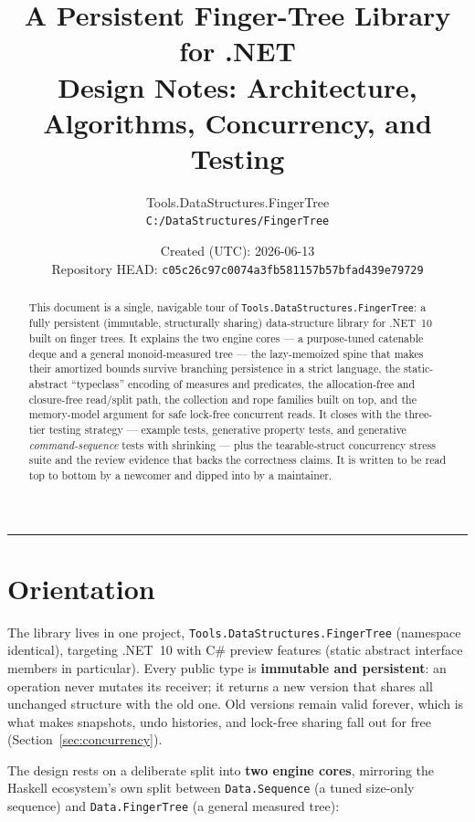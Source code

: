 \documentclass[11pt]{article}
\title{\textbf{A Persistent Finger-Tree Library for .NET}\\[2mm]
  \large Design Notes: Architecture, Algorithms, Concurrency, and Testing}
\author{Tools.DataStructures.FingerTree\\ \texttt{C:/DataStructures/FingerTree}}
\date{Created (UTC): 2026-06-13\\[1mm]
  Repository HEAD: \texttt{c05c26c97c0074a3fb581157b57bfad439e79729}}
\begin{document}
\maketitle

\begin{abstract}
This document is a single, navigable tour of \texttt{Tools.DataStructures.FingerTree}: a fully
persistent (immutable, structurally sharing) data-structure library for .NET~10 built on finger trees.
It explains the two engine cores --- a purpose-tuned catenable deque and a general monoid-measured
tree --- the lazy-memoized spine that makes their amortized bounds survive branching persistence in a
strict language, the static-abstract ``typeclass'' encoding of measures and predicates, the
allocation-free and closure-free read/split path, the collection and rope families built on top, and
the memory-model argument for safe lock-free concurrent reads. It closes with the three-tier testing
strategy --- example tests, generative property tests, and generative \emph{command-sequence} tests
with shrinking --- plus the tearable-struct concurrency stress suite and the review evidence that backs
the correctness claims. It is written to be read top to bottom by a newcomer and dipped into by a
maintainer.
\end{abstract}

\tableofcontents
\bigskip
\hrule
\bigskip

\section{Orientation}
\label{sec:orientation}

The library lives in one project, \texttt{Tools.DataStructures.FingerTree} (namespace identical),
targeting .NET~10 with C\# preview features (static abstract interface members in particular). Every
public type is \textbf{immutable and persistent}: an operation never mutates its receiver; it returns a
new version that shares all unchanged structure with the old one. Old versions remain valid forever,
which is what makes snapshots, undo histories, and lock-free sharing fall out for free
(Section~\ref{sec:concurrency}).

The design rests on a deliberate split into \textbf{two engine cores}, mirroring the Haskell ecosystem's
own split between \texttt{Data.Sequence} (a tuned size-only sequence) and \texttt{Data.FingerTree} (a
general measured tree):
\end{document}
